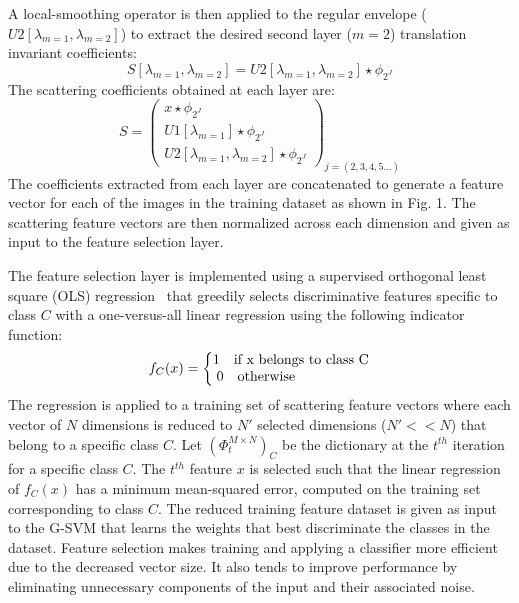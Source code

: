 \documentclass{article}
\begin{document}
A local-smoothing operator is then applied to the regular envelope ($U2[\lambda_{m = 1},\lambda_{m = 2}]$) to extract the desired second layer ($m = 2$) translation invariant coefficients: 
\vspace{-0.3em}
\begin{equation}
S[\lambda_{m = 1},\lambda_{m = 2}] = U2[\lambda_{m = 1},\lambda_{m = 2}] \star \phi_{2^J}
\end{equation}
The scattering coefficients obtained at each layer are:
\vspace{-0.3em}
\begin{equation}
S = \begin{pmatrix}
x \star \phi_{2^J} \\
U1[\lambda_{m = 1}] \star \phi_{2^J}
\\ U2[\lambda_{m = 1},\lambda_{m = 2}] \star \phi_{2^J}
\end{pmatrix}_{j = (2,3,4,5...)}
\end{equation} 
The coefficients extracted from each layer are concatenated to generate a feature vector for each of the images in the training dataset as shown in Fig. 1. The scattering feature vectors are then normalized across each dimension and given as input to the feature selection layer. 

The feature selection layer is implemented using a supervised orthogonal least square (OLS) regression~\cite{Blumensath} that greedily selects discriminative features specific to class $C$ with a one-versus-all linear regression using the following indicator function:
\vspace{-0.3em}
\begin{equation}
\begin{aligned}
f_{C}(x) = \left\{\begin{matrix}
1 \quad $\text{if x belongs to class C}$ \\ 
0 \quad $\text{otherwise}$ \quad \quad \quad \quad \quad 
\end{matrix}\right.
\end{aligned}
\end{equation}
The regression is applied to a training set of scattering feature vectors where each vector of $N$ dimensions is reduced to $N'$ selected dimensions ($N' << N$) that belong to a specific class $C$. Let $(\Phi^{M\times N}_{t})_{C}$ be the dictionary at the $t^{th}$ iteration for a specific class $C$. The $t^{th}$ feature $x$ is selected such that the linear regression of $f_{C}(x)$ has a minimum mean-squared error, computed on the training set corresponding to class $C$. The reduced training feature dataset is given as input to the G-SVM that learns the weights that best discriminate the classes in the dataset. Feature selection makes training and applying a classifier more efficient due to the decreased vector size. It also tends to improve performance by eliminating unnecessary components of the input and their associated noise.
\end{document}
